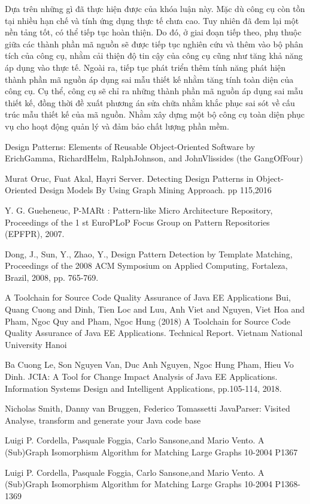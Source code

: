 \documentclass[12pt]{report}
\begin{document}
\noindent Dựa trên những gì đã thực hiện được của khóa luận này. Mặc dù công cụ còn tồn tại nhiều hạn chế và tính ứng dụng thực tế chưa cao. Tuy nhiên đã đem lại một nền tảng tốt, có thể tiếp tục hoàn thiện. Do đó, ở giai đoạn tiếp theo, phụ thuộc giữa các thành phần mã nguồn sẽ được tiếp tục nghiên cứu và thêm vào bộ phân tích của công cụ, nhằm cải thiện độ tin cậy của công cụ cũng như tăng khả năng áp dụng vào thực tế. Ngoài ra, tiếp tục phát triển thêm tính năng phát hiện thành phần mã nguồn áp dụng sai mẫu thiết kế nhằm tăng tính toàn diện của công cụ. Cụ thể, công cụ sẽ chỉ ra những thành phần mã nguồn áp dụng sai mẫu thiết kế, đồng thời đề xuất phương án sửa chữa nhằm khắc phục sai sót về cấu trúc mẫu thiết kế của mã nguồn. Nhằm xây dựng một bộ công cụ toàn diện phục vụ cho hoạt động quản lý và đảm bảo chất lượng phần mềm.
\begin{thebibliography}{9}
	Design Patterns: Elements of Reusable Object-Oriented Software by ErichGamma, RichardHelm, RalphJohnson, and JohnVlissides (the GangOfFour)
	
	Murat Oruc, Fuat Akal, Hayri Server. Detecting Design Patterns in  Object-Oriented Design Models By Using Graph Mining Approach. pp 115,2016
	
	Y. G. Gueheneuc, P-MARt : Pattern-like Micro Architecture
	Repository, Proceedings of the 1 st EuroPLoP Focus Group on Pattern
	Repositories (EPFPR), 2007.
	
	Dong, J., Sun, Y., Zhao, Y., Design Pattern Detection by Template
	Matching, Proceedings of the 2008 ACM Symposium on Applied
	Computing, Fortaleza, Brazil, 2008, pp. 765-769.
	
	A Toolchain for Source Code Quality Assurance of Java EE Applications
	Bui, Quang Cuong and Dinh, Tien Loc and Luu, Anh Viet and Nguyen, Viet Hoa and Pham, Ngoc Quy and Pham, Ngoc Hung (2018) A Toolchain for Source Code Quality Assurance of Java EE Applications. Technical Report. Vietnam National University Hanoi
	

	Ba Cuong Le, Son Nguyen Van, Duc Anh Nguyen, Ngoc Hung Pham, Hieu Vo Dinh. JCIA: A Tool for Change Impact Analysis of Java EE Applications. Information Systems Design and Intelligent Applications, pp.105-114, 2018.
	
	Nicholas Smith, Danny van Bruggen, Federico Tomassetti
	JavaParser: Visited
	Analyse, transform and generate your Java code base
	
	Luigi P. Cordella, Pasquale Foggia, Carlo Sansone,and Mario Vento. A (Sub)Graph Isomorphism Algorithm for
	Matching Large Graphs 10-2004 P1367
	
	Luigi P. Cordella, Pasquale Foggia, Carlo Sansone,and Mario Vento. A (Sub)Graph Isomorphism Algorithm for
	Matching Large Graphs 10-2004 P1368-1369
\end{thebibliography}
\end{document}
